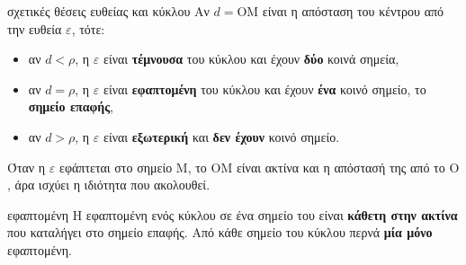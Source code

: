 \begin{center}
\end{center}

\begin{kanonas}{σχετικές θέσεις ευθείας και κύκλου}
Αν $d=\mathrm{ΟΜ}$ είναι η απόσταση του κέντρου από την ευθεία $\varepsilon$, τότε:
\begin{itemize}[leftmargin=1.2em,itemsep=0.3ex,topsep=2pt]
\item αν $d<\rho$, η $\varepsilon$ είναι \textbf{τέμνουσα} του κύκλου και έχουν \textbf{δύο} κοινά σημεία,
\item αν $d=\rho$, η $\varepsilon$ είναι \textbf{εφαπτομένη} του κύκλου και έχουν \textbf{ένα} κοινό σημείο, το \textbf{σημείο επαφής},
\item αν $d>\rho$, η $\varepsilon$ είναι \textbf{εξωτερική} και \textbf{δεν έχουν} κοινό σημείο.
\end{itemize}
\end{kanonas}

Όταν η $\varepsilon$ εφάπτεται στο σημείο $\mathrm{Μ}$, το $\mathrm{ΟΜ}$ είναι ακτίνα και η απόστασή της από το $\mathrm{Ο}$, άρα ισχύει η ιδιότητα που ακολουθεί.

\begin{idiotita}{εφαπτομένη}
Η εφαπτομένη ενός κύκλου σε ένα σημείο του είναι \textbf{κάθετη στην ακτίνα} που καταλήγει στο σημείο επαφής. Από κάθε σημείο του κύκλου περνά \textbf{μία μόνο} εφαπτομένη.
\end{idiotita}


